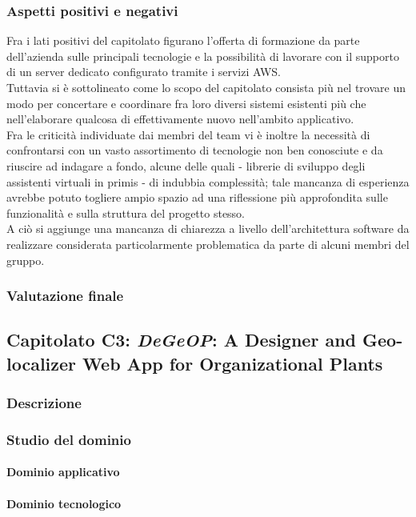 		\subsubsection{Aspetti positivi e negativi}
		Fra i lati positivi del capitolato figurano l'offerta di formazione da parte dell'azienda sulle principali tecnologie e la possibilità di 
		lavorare con il supporto di un server dedicato configurato tramite i servizi AWS.\\
		Tuttavia si è sottolineato come lo scopo del capitolato consista più nel trovare un modo per concertare e coordinare fra loro diversi sistemi 
		esistenti più che nell'elaborare qualcosa di effettivamente nuovo nell'ambito applicativo.\\
		Fra le criticità individuate dai membri del team vi è inoltre la necessità di confrontarsi con un vasto assortimento di tecnologie non ben 
		conosciute e da riuscire ad indagare a fondo, alcune delle quali - librerie di sviluppo degli assistenti virtuali in primis - di indubbia 
		complessità; tale mancanza di esperienza avrebbe potuto togliere ampio spazio ad una riflessione più approfondita sulle funzionalità e sulla 
		struttura del progetto stesso.\\
		A ciò si aggiunge una mancanza di chiarezza a livello dell'architettura software da realizzare considerata particolarmente problematica da 
		parte di alcuni membri del gruppo.
		\subsubsection{Valutazione finale}
		
	\subsection{Capitolato C3: \emph{DeGeOP}: A Designer and Geo-localizer Web App for Organizational Plants}
		\subsubsection{Descrizione}
		\subsubsection{Studio del dominio}
			\paragraph{Dominio applicativo}
			\paragraph{Dominio tecnologico}
